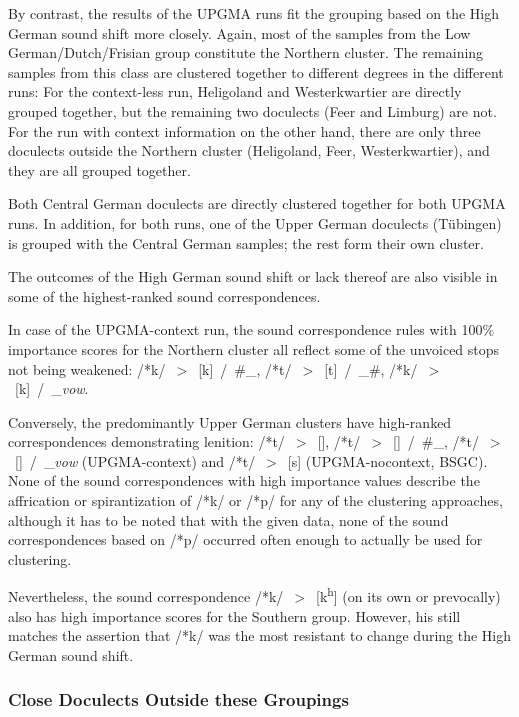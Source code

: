 \documentclass[a4paper]{article}
\begin{document}
By contrast, the results of the UPGMA runs fit
the grouping based on the High German sound shift more closely.
Again, most of the samples from the Low German/Dutch/Frisian group
constitute the Northern cluster.
The remaining samples from this class are clustered together
to different degrees in the different runs:
For the context-less run,
Heligoland and Westerkwartier are directly grouped together,
but the remaining two doculects (Feer and Limburg) are not.
For the run with context information on the other hand,
there are only three doculects outside the Northern cluster
(Heligoland, Feer, Westerkwartier),
and they are all grouped together.

Both Central German doculects are directly clustered together
for both UPGMA runs. In addition, for both runs, one of the
Upper German doculects (T\"{u}bingen) is grouped with the
Central German samples; the rest form their own cluster.

The outcomes of the High German sound shift or lack thereof
are also visible in some of the highest-ranked sound correspondences.

In case of the UPGMA-context run,
the sound correspondence rules with 100\% importance scores
for the Northern cluster
all reflect some of the unvoiced stops not being weakened:
/*k/~$>$~[k]~/~\#\_, /*t/~$>$~[t]~/~\_\#, /*k/~$>$~[k]~/~\_\textit{vow}.

Conversely, the predominantly Upper German clusters
have high-ranked correspondences demonstrating lenition:
/*t/~$>$~[], /*t/~$>$~[]~/~\#\_,
/*t/~$>$~[]~/~\_\textit{vow} (UPGMA-context)
and /*t/~$>$~[s] (UPGMA-nocontext, BSGC).
None of the sound correspondences with high importance values
describe the affrication or spirantization of /*k/ or /*p/
for any of the clustering approaches,
although it has to be noted that with the given data,
none of the sound correspondences based on /*p/
occurred often enough to actually be used for clustering.

Nevertheless, the sound correspondence /*k/~$>$~[k\textsuperscript{h}]
(on its own or prevocally) also has high importance scores
for the Southern group.
However, his still matches the assertion that /*k/
was the most resistant to change during the High German sound shift.

\subsubsection{Close Doculects Outside these Groupings}
\label{subsubsec:cosine}
\end{document}
